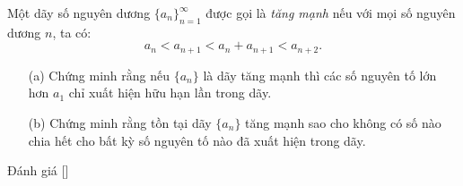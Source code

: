 \ifshowproblem
\begin{problem}\label{problem:JPN-2015-MO-P3}
	Một dãy số nguyên dương \( \{a_n\}_{n=1}^{\infty} \) được gọi là \textit{tăng mạnh} nếu với mọi số nguyên dương \( n \), ta có:
	\[
		a_n < a_{n+1} < a_n + a_{n+1} < a_{n+2}.
	\]
	
	\begin{itemize}[topsep=0pt, partopsep=0pt, itemsep=0pt]
		\item[(a)] Chứng minh rằng nếu \( \{a_n\} \) là dãy tăng mạnh thì các số nguyên tố lớn hơn \( a_1 \) chỉ xuất hiện hữu hạn lần trong dãy.
		\item[(b)] Chứng minh rằng tồn tại dãy \( \{a_n\} \) tăng mạnh sao cho không có số nào chia hết cho bất kỳ số nguyên tố nào đã xuất hiện trong dãy.
	\end{itemize}
\end{problem}
\fi

\ifshowinfo
Đánh giá [\textbf{}]
\fi